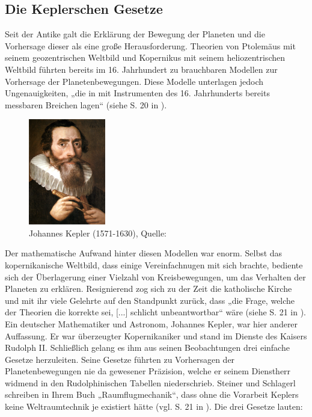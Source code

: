 \subsection{Die Keplerschen Gesetze}
\label{subsec:kepler}
Seit der Antike galt die Erklärung der Bewegung der Planeten und die Vorhersage dieser als eine große Herausforderung. Theorien von Ptolemäus mit seinem geozentrischen Weltbild und Kopernikus mit seinem heliozentrischen Weltbild führten bereits im 16. Jahrhundert zu brauchbaren Modellen zur Vorhersage der Planetenbewegungen. Diese Modelle unterlagen jedoch Ungenauigkeiten, „die in mit Instrumenten des 16. Jahrhunderts bereits messbaren Breichen lagen“ (siehe S. 20 in \cite{Raumflugm}). 
\begin{figure}[h]                                                                           %
	\centering                                                                            	%
	\includegraphics[width=0.3\textwidth]{./images/kepler.jpg}                              %
	\caption[Bahnelemente]{Johannes Kepler (1571-1630), Quelle: \cite{Wiki:Kepler}}         %
	\label{fig:kepler}                                                                %
\end{figure}                                                                              	%
Der mathematische Aufwand hinter diesen Modellen war enorm. Selbst das kopernikanische Weltbild, dass einige Vereinfachnugen mit sich brachte, bediente sich der Überlagerung einer Vielzahl von Kreisbewegungen, um das Verhalten der Planeten zu erklären. Resignierend zog sich zu der Zeit die katholische Kirche und mit ihr viele Gelehrte auf den Standpunkt zurück, dass „die Frage, welche der Theorien die korrekte sei, [...] schlicht unbeantwortbar“ wäre (siehe S. 21 in \cite{Raumflugm}). 
\newpar
Ein deutscher Mathematiker und Astronom, Johannes Kepler, war hier anderer Auffassung. Er war überzeugter Kopernikaniker und stand im Dienste des Kaisers Rudolph II. Schließlich gelang es ihm aus seinen Beobachtungen drei einfache Gesetze herzuleiten. Seine Gesetze führten zu Vorhersagen der Planetenbewegungen nie da gewesener Präzision, welche er seinem Dienstherr widmend in den Rudolphinischen Tabellen niederschrieb. Steiner und Schlagerl schreiben in Ihrem Buch „Raumflugmechanik“, dass ohne die Vorarbeit Keplers keine Weltraumtechnik je existiert hätte (vgl. S. 21 in \cite{Raumflugm}). Die drei Gesetze lauten:
